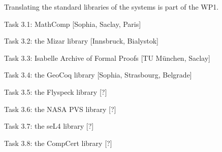 Translating the standard libraries of the systems is part of the WP1. 

Task 3.1: MathComp [Sophia, Saclay, Paris]

Task 3.2: the Mizar library [Innsbruck, Bialystok]

Task 3.3: Isabelle Archive of Formal Proofs [TU München, Saclay]

Task 3.4: the GeoCoq library [Sophia, Strasbourg, Belgrade]

Task 3.5: the Flyspeck library [?]

Task 3.6: the NASA PVS library [?]

Task 3.7: the seL4 library [?]

Task 3.8: the CompCert library [?]
